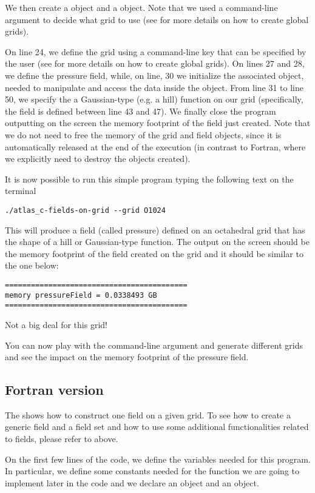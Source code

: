 We then create 
a  object and a  object.
Note that we used a command-line argument to decide 
what grid to use (see  for 
more details on how to create global grids).

On line 24, we define the grid using a command-line key 
that can be specified by the user (see 
for more details on how to create global grids).
On lines 27 and 28, we define the pressure field, while, 
on line, 30 we initialize the associated  
object, needed to manipulate and access the data inside the 
 object.
From line 31 to line 50, we specify the a Gaussian-type 
(e.g. a hill) function on our grid (specifically, the 
field is defined between line 43 and 47).
We finally close the program outputting on the screen 
the memory footprint of the field just created.
Note that we do not need to free the memory of the grid 
and field objects, since it is automatically released 
at the end of the execution (in contrast to Fortran, 
where we explicitly need to destroy the objects created).

It is now possible to run this simple program typing
the following text on the terminal
%
\begin{lstlisting}[style=BashStyle]
./atlas_c-fields-on-grid --grid O1024
\end{lstlisting}
% 
This will produce a field (called pressure) defined 
on an octahedral grid that has the shape of a hill 
or Gaussian-type function.
The output on the screen should be the memory footprint 
of the field created on the grid and it should be similar 
to the one below:
%
\begin{lstlisting}[style=BashStyle]
==========================================
memory pressureField = 0.0338493 GB
==========================================
\end{lstlisting}
% 
Not a big deal for this grid!

You can now play with the command-line argument and 
generate different grids and see the impact on the 
memory footprint of the pressure field.



\subsection{Fortran version}
The  shows how to construct one field
on a given grid. To see how to create a generic field and 
a field set and how to use some additional functionalities 
related to fields, please refer to 
above. 
%

%
On the first few lines of the code, we define the variables
needed for this program. In particular, we define some constants 
needed for the function we are going to implement later in the 
code and we declare an  object and 
an  object.

